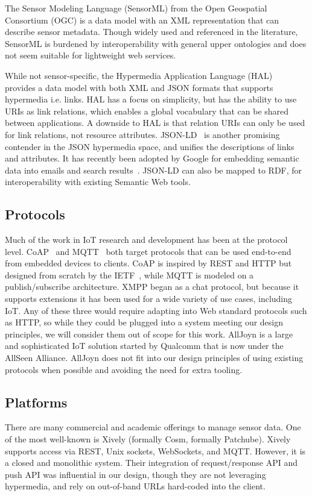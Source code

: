 \documentclass{acm_proc_article-sp}
\begin{document}
The Sensor Modeling Language (SensorML) from the Open Geospatial Consortium
(OGC) is a data model with an XML representation that can describe sensor
metadata. Though widely used and referenced in the literature, SensorML is
burdened by interoperability with general upper ontologies and does not seem
suitable for lightweight web services.

While not sensor-specific, the Hypermedia Application Language
(HAL)~\cite{json-hal-draft} provides a data model with both XML and JSON
formats that supports hypermedia i.e. links. HAL has a focus on simplicity,
but has the ability to use URIs as link relations, which enables a global
vocabulary that can be shared between applications. A downside to HAL is that
relation URIs can only be used for link relations, not resource attributes.
JSON-LD~\cite{json-ld} is another promising contender in the JSON hypermedia
space, and unifies the descriptions of links and attributes. It has recently
been adopted by Google for embedding semantic data into emails and search
results~\cite{sporny_google}. JSON-LD can also be mapped to RDF, for
interoperability with existing Semantic Web tools.

\subsection{Protocols}
Much of the work in IoT research and development has been at the protocol
level. CoAP~\cite{coap} and MQTT~\cite{mqtt} both target protocols that can be
used end-to-end from embedded devices to clients. CoAP is inspired by REST and
HTTP but designed from scratch by the IETF~\cite{californium}, while MQTT is
modeled on a publish/subscribe architecture. XMPP began as a chat protocol, but
because it supports extensions it has been used for a wide variety of use
cases, including IoT. Any of these three would require adapting into Web
standard protocols such as HTTP, so while they could be plugged into a system
meeting our design principles, we will consider them out of scope for this
work. AllJoyn is a large and sophisticated IoT solution started by Qualcomm
that is now under the AllSeen Alliance. AllJoyn does not fit into our design
principles of using existing protocols when possible and avoiding the need for
extra tooling.

\subsection{Platforms}
There are many commercial and academic offerings to manage sensor data. One of
the most well-known is Xively (formally Cosm, formally Patchube). Xively
supports access via REST, Unix sockets, WebSockets, and MQTT. However, it is a
closed and monolithic system. Their integration of request/response API and
push API was influential in our design, though they are not leveraging
hypermedia, and rely on out-of-band URLs hard-coded into the client.
\end{document}
